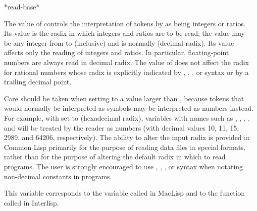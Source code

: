 \begin{defun}[Variable]
*read-base*

The value of  controls the interpretation of tokens
by  as being integers or ratios.  Its value is the radix
in which integers and ratios are to be read; the value may be any integer
from  to  (inclusive) and is normally  (decimal radix).
Its value affects only the reading of integers and ratios.
In particular, floating-point numbers are always read in decimal radix.
The value of  does not affect the radix for rational numbers
whose radix is explicitly indicated by
, , , or  syntax
or by a trailing decimal point.

Care should be taken when setting  to a value larger
than , because tokens that would normally be interpreted as
symbols may be interpreted as numbers instead.  For example,
with  set to  (hexadecimal radix), variables
with names such as , , , , and 
will be treated by the reader as numbers (with decimal values
10, 11, 15, 2989, and 64206, respectively).  The ability to alter
the input radix is provided in Common Lisp primarily for the purpose of
reading data files in special formats, rather than for the purpose of altering
the default radix in which to read programs.  The user is strongly
encouraged to use , , , or  syntax when
notating non-decimal constants in programs.

\beforenoterule
\begin{incompatibility}
This variable corresponds to the variable
called  in MacLisp and to the function called 
in Interlisp.
\end{incompatibility}
\afternoterule
\end{defun}


